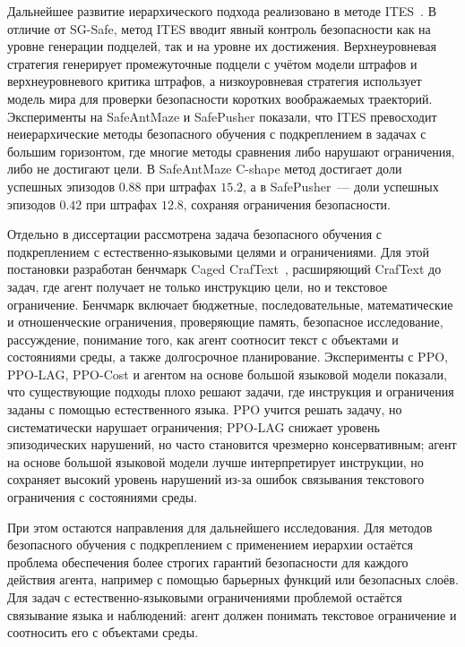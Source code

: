 Дальнейшее развитие иерархического подхода реализовано в методе ITES~. В отличие от SG-Safe, метод ITES вводит явный контроль безопасности как на уровне генерации подцелей, так и на уровне их достижения. Верхнеуровневая стратегия генерирует промежуточные подцели с учётом модели штрафов и верхнеуровневого критика штрафов, а низкоуровневая стратегия использует модель мира для проверки безопасности коротких воображаемых траекторий. Эксперименты на SafeAntMaze и SafePusher показали, что ITES превосходит неиерархические методы безопасного обучения с подкреплением в задачах с большим горизонтом, где многие методы сравнения либо нарушают ограничения, либо не достигают цели. В SafeAntMaze C-shape метод достигает доли успешных эпизодов $0.88$ при штрафах $15.2$, а в SafePusher~--- доли успешных эпизодов $0.42$ при штрафах $12.8$, сохраняя ограничения безопасности.

Отдельно в диссертации рассмотрена задача безопасного обучения с подкреплением с естественно-языковыми целями и ограничениями. Для этой постановки разработан бенчмарк Caged CrafText~, расширяющий CrafText до задач, где агент получает не только инструкцию цели, но и текстовое ограничение. Бенчмарк включает бюджетные, последовательные, математические и отношенческие ограничения, проверяющие память, безопасное исследование, рассуждение, понимание того, как агент соотносит текст с объектами и состояниями среды, а также долгосрочное планирование. Эксперименты с PPO, PPO-LAG, PPO-Cost и агентом на основе большой языковой модели показали, что существующие подходы плохо решают задачи, где инструкция и ограничения заданы с помощью естественного языка. PPO учится решать задачу, но систематически нарушает ограничения; PPO-LAG снижает уровень эпизодических нарушений, но часто становится чрезмерно консервативным; агент на основе большой языковой модели лучше интерпретирует инструкции, но сохраняет высокий уровень нарушений из-за ошибок связывания текстового ограничения с состояниями среды.


При этом остаются направления для дальнейшего исследования. Для методов безопасного обучения с подкреплением с применением иерархии остаётся проблема обеспечения более строгих гарантий безопасности для каждого действия агента, например с помощью барьерных функций или безопасных слоёв. Для задач с естественно-языковыми ограничениями проблемой остаётся связывание языка и наблюдений: агент должен понимать текстовое ограничение и соотносить его с объектами среды.

